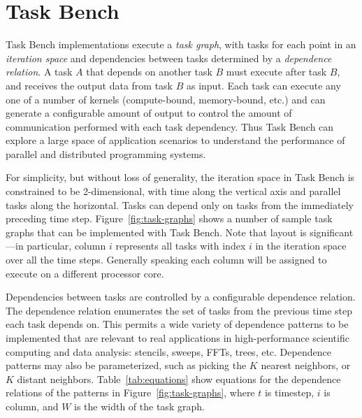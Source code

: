 \section{Task Bench}
\label{sec:task-bench}


Task Bench
implementations execute a \emph{task graph}, with tasks for each point
in an \emph{iteration space} and dependencies between tasks determined
by a \emph{dependence relation}. A task $A$ that depends on another task $B$
must execute after task $B$, and receives the output data from
task $B$ as input. Each task can execute any one of a
number of kernels (compute-bound, memory-bound, etc.) and can generate
a configurable amount of output to control the amount of communication
performed with each task dependency. Thus Task Bench can explore a large space of application scenarios to
understand the performance of parallel and
distributed programming systems.

For simplicity, but without loss of generality, the iteration space in
Task Bench is constrained to be 2-dimensional, with time along
the vertical axis and parallel tasks along the
horizontal. Tasks can depend only on tasks from the immediately
preceding time step. Figure~\ref{fig:task-graphs} shows a number of sample task
graphs that can be implemented with Task Bench. Note that layout is
significant---in particular, column $i$ represents all tasks
with index $i$ in the iteration space over all the time
steps. Generally speaking each column will be
assigned to execute on a different processor core.

Dependencies between tasks are controlled by a configurable dependence
relation. The
dependence relation enumerates the set of tasks from the
previous time step each task depends on. This permits a wide variety
of dependence patterns to be implemented that are relevant to real
applications in high-performance scientific computing and data analysis: stencils,
sweeps, FFTs, trees, etc. Dependence patterns may also be
parameterized, such as picking the $K$ nearest neighbors, or $K$
distant neighbors. Table~\ref{tab:equations} show equations for the
dependence relations of the patterns in Figure~\ref{fig:task-graphs},
where $t$ is timestep, $i$ is column, and $W$ is the width of the task
graph.

